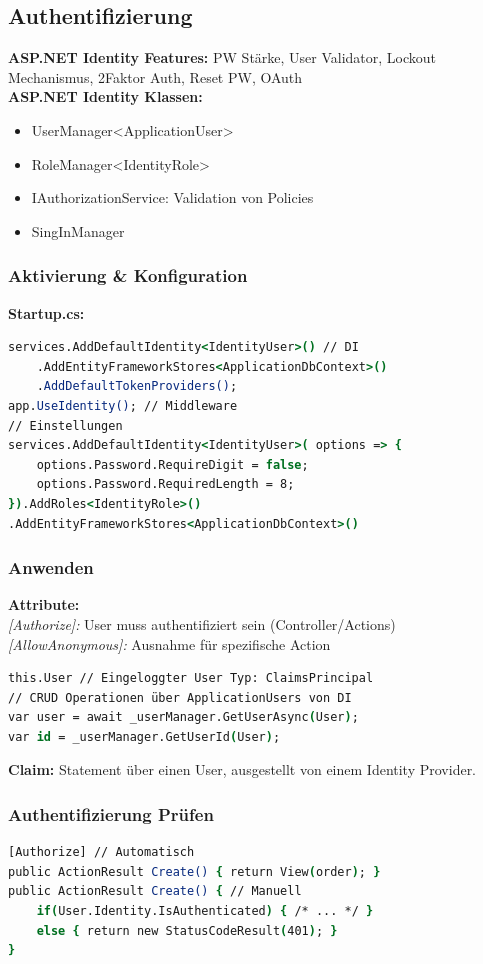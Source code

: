 \subsection{Authentifizierung}
\textbf{ASP.NET Identity Features:} PW Stärke, User Validator, Lockout Mechanismus, 2Faktor Auth, Reset PW, OAuth\\
\textbf{ASP.NET Identity Klassen:}
\begin{itemize}
    \item UserManager<ApplicationUser>
    \item RoleManager<IdentityRole>
    \item IAuthorizationService: Validation von Policies
    \item SingInManager
\end{itemize}

\subsubsection{Aktivierung \& Konfiguration}
\textbf{Startup.cs:}
\begin{lstlisting}[language=csh]
services.AddDefaultIdentity<IdentityUser>() // DI
    .AddEntityFrameworkStores<ApplicationDbContext>()
    .AddDefaultTokenProviders();
app.UseIdentity(); // Middleware
// Einstellungen
services.AddDefaultIdentity<IdentityUser>( options => {
    options.Password.RequireDigit = false;
    options.Password.RequiredLength = 8;
}).AddRoles<IdentityRole>()
.AddEntityFrameworkStores<ApplicationDbContext>()
\end{lstlisting}

\subsubsection{Anwenden}
\textbf{Attribute:}\\
\textit{[Authorize]:} User muss authentifiziert sein (Controller/Actions)\\
\textit{[AllowAnonymous]:} Ausnahme für spezifische Action
\begin{lstlisting}[language=csh]
this.User // Eingeloggter User Typ: ClaimsPrincipal
// CRUD Operationen über ApplicationUsers von DI
var user = await _userManager.GetUserAsync(User);
var id = _userManager.GetUserId(User);
\end{lstlisting}
\textbf{Claim:} Statement über einen User, ausgestellt von einem Identity Provider.\\

\subsubsection{Authentifizierung Prüfen}
\begin{lstlisting}[language=csh]
[Authorize] // Automatisch
public ActionResult Create() { return View(order); }
public ActionResult Create() { // Manuell
    if(User.Identity.IsAuthenticated) { /* ... */ }
    else { return new StatusCodeResult(401); }
}
\end{lstlisting}

